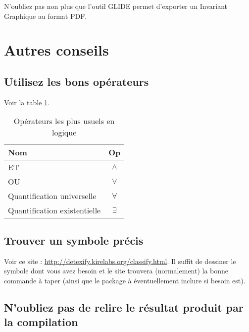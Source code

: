 \documentclass[a4paper, 11pt, oneside]{article}
\begin{document}
N'oubliez pas non plus que l'outil GLIDE permet d'exporter un Invariant Graphique au format PDF.

\section{Autres conseils}

\subsection{Utilisez les bons opérateurs}

Voir la table \ref{table:op}.

\begin{table}[!h]
\centering
\begin{tabular}{l c}
Nom & Op \\
\hline
ET & $\land$ \\
OU & $\lor$ \\
Quantification universelle & $\forall$ \\
Quantification existentielle & $\exists$ \\
\end{tabular}
\caption{Opérateurs les plus usuels en logique}
\label{table:op}
\end{table}

\subsection{Trouver un symbole précis}

Voir ce site : \url{http://detexify.kirelabs.org/classify.html}. Il suffit de dessiner le symbole dont vous avez besoin et le site trouvera (normalement) la bonne commande à taper (ainsi que le package à éventuellement inclure si besoin est).

\subsection{N'oubliez pas de relire le résultat produit par la compilation}
\end{document}
